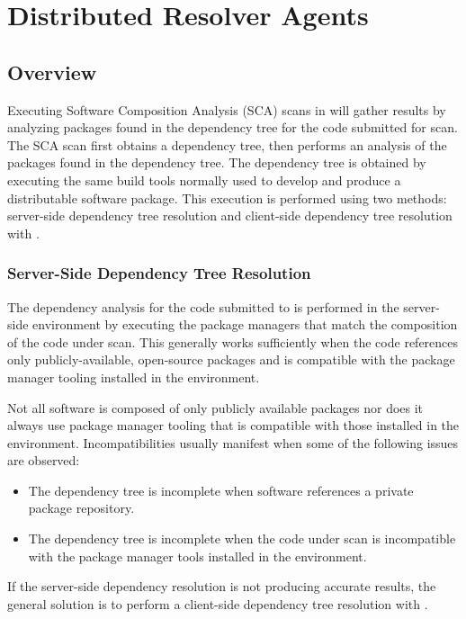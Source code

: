 \chapter{Distributed Resolver Agents}\label{sec:resolver-agents}

\section{Overview}

Executing Software Composition Analysis (SCA) scans in \cxone will gather results
by analyzing packages found in the dependency tree for the code submitted for scan.  
The \cxone SCA scan first obtains a dependency tree, then performs an analysis
of the packages found in the dependency tree. The dependency
tree is obtained by executing the same build tools normally used to develop and produce a
distributable software package.  This execution is performed using two methods: server-side 
dependency tree resolution and client-side dependency tree resolution with \scaresolver.

\subsection{Server-Side Dependency Tree Resolution}

The dependency analysis for the code submitted to \cxone is performed
in the server-side \cxone environment by executing the package managers that match the composition of the code
under scan.  This generally works sufficiently when the code references only publicly-available, open-source
packages and is compatible with the package manager tooling installed in the \cxone environment.  

Not all software is composed of only publicly available packages nor does it always use package manager tooling
that is compatible with those installed in the \cxone environment.  Incompatibilities usually manifest
when some of the following issues are observed:

\begin{itemize}
  \item The dependency tree is incomplete when software references a private package repository.
  \item The dependency tree is incomplete when the code under scan is incompatible with the 
  package manager tools installed in the \cxone environment.
\end{itemize}

If the server-side dependency resolution is not producing accurate results, the general solution is to
perform a client-side dependency tree resolution with \scaresolver. 

